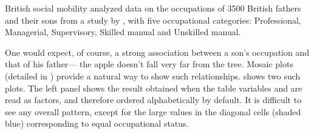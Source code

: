 \documentclass[11pt]{book}
\begin{document}
\begin{Example}[glass]{British social mobility}
\citet[p. 100]{Bishop-etal:75} analyzed data on the occupations of
3500 British fathers and their sons from a study by \citet{Glass:54},
with five occupational categories:
Professional, Managerial, Supervisory, Skilled manual and Unskilled manual.

One would expect, of course, a strong association between a son's
occupation and that of his father--- the apple doesn't
fall very far from the tree.
Mosaic plots (detailed in )
provide a natural way to show such relationships.
 shows two such plots.  
The left panel shows the result obtained when the table variables
 and  are read as factors, and therefore
ordered alphabetically by default.
It is difficult to see any overall pattern, except for the
large values in the diagonal cells (shaded blue) corresponding to equal
occupational status.


\end{Example}
\end{document}

